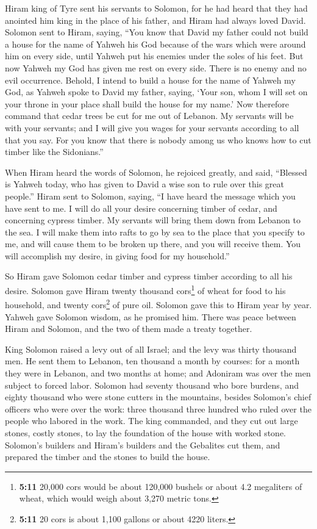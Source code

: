  Hiram king of Tyre sent his servants to Solomon, for he
had heard that they had anointed him king in the place of his father,
and Hiram had always loved David.  Solomon sent to Hiram,
saying,  ``You know that David my father could not build a
house for the name of Yahweh his God because of the wars which were
around him on every side, until Yahweh put his enemies under the soles
of his feet.  But now Yahweh my God has given me rest on
every side. There is no enemy and no evil occurrence. 
Behold, I intend to build a house for the name of Yahweh my God, as
Yahweh spoke to David my father, saying, `Your son, whom I will set on
your throne in your place shall build the house for my name.'
 Now therefore command that cedar trees be cut for me out
of Lebanon. My servants will be with your servants; and I will give you
wages for your servants according to all that you say. For you know that
there is nobody among us who knows how to cut timber like the
Sidonians.''

 When Hiram heard the words of Solomon, he rejoiced
greatly, and said, ``Blessed is Yahweh today, who has given to David a
wise son to rule over this great people.''  Hiram sent to
Solomon, saying, ``I have heard the message which you have sent to me. I
will do all your desire concerning timber of cedar, and concerning
cypress timber.  My servants will bring them down from
Lebanon to the sea. I will make them into rafts to go by sea to the
place that you specify to me, and will cause them to be broken up there,
and you will receive them. You will accomplish my desire, in giving food
for my household.''

 So Hiram gave Solomon cedar timber and cypress timber
according to all his desire.  Solomon gave Hiram twenty
thousand cors\footnote{\textbf{5:11} 20,000 cors would be about 120,000
  bushels or about 4.2 megaliters of wheat, which would weigh about
  3,270 metric tons.} of wheat for food to his household, and twenty
cors\footnote{\textbf{5:11} 20 cors is about 1,100 gallons or about 4220
  liters.} of pure oil. Solomon gave this to Hiram year by year.
 Yahweh gave Solomon wisdom, as he promised him. There
was peace between Hiram and Solomon, and the two of them made a treaty
together.

 King Solomon raised a levy out of all Israel; and the
levy was thirty thousand men.  He sent them to Lebanon,
ten thousand a month by courses: for a month they were in Lebanon, and
two months at home; and Adoniram was over the men subject to forced
labor.  Solomon had seventy thousand who bore burdens,
and eighty thousand who were stone cutters in the mountains,
 besides Solomon's chief officers who were over the work:
three thousand three hundred who ruled over the people who labored in
the work.  The king commanded, and they cut out large
stones, costly stones, to lay the foundation of the house with worked
stone.  Solomon's builders and Hiram's builders and the
Gebalites cut them, and prepared the timber and the stones to build the
house.

